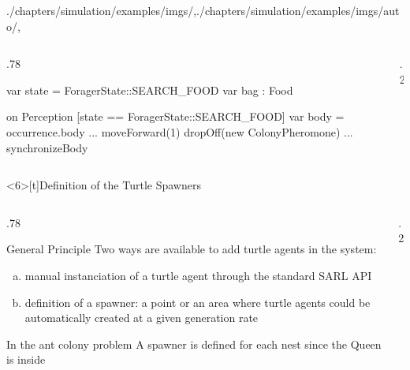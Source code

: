 \begin{graphicspathcontext}{{./chapters/simulation/examples/imgs/},{./chapters/simulation/examples/imgs/auto/},\old}
\begin{frame}
\begin{columns}
\begin{column}[t]{.78\linewidth}
\begin{sarllisting}[basicstyle=\scriptsize]
{  var state = ForagerState::SEARCH_FOOD
  var bag : Food

  on Perception [state == ForagerState::SEARCH_FOOD] {
   var body = occurrence.body
		...
       moveForward(1)
       dropOff(new ColonyPheromone)
		...
   synchronizeBody
  }
}
			\end{sarllisting}
		\end{column}
		\begin{column}[t]{.2\linewidth}
		\end{column}
	\end{columns}
\end{frame}

\begin{frame}<6>[t]{Definition of the Turtle Spawners}
	\vspace{-.5cm}
	\smaller
	\begin{columns}
		\begin{column}[t]{.78\linewidth}
			\begin{alertblock}{General Principle}
			Two ways are available to add turtle agents in the system:
				\begin{enumerate}[a)]
				\item manual instanciation of a turtle agent through the standard SARL API
				\item definition of a spawner: a point or an area where turtle agents could be automatically created at a given generation rate
				\end{enumerate}
			\end{alertblock}
			\begin{block}{In the ant colony problem}
				A spawner is defined for each nest since the Queen is inside
			\end{block}
		\end{column}
		\begin{column}[t]{.2\linewidth}
		\end{column}
	\end{columns}
\end{frame}


\end{graphicspathcontext}
